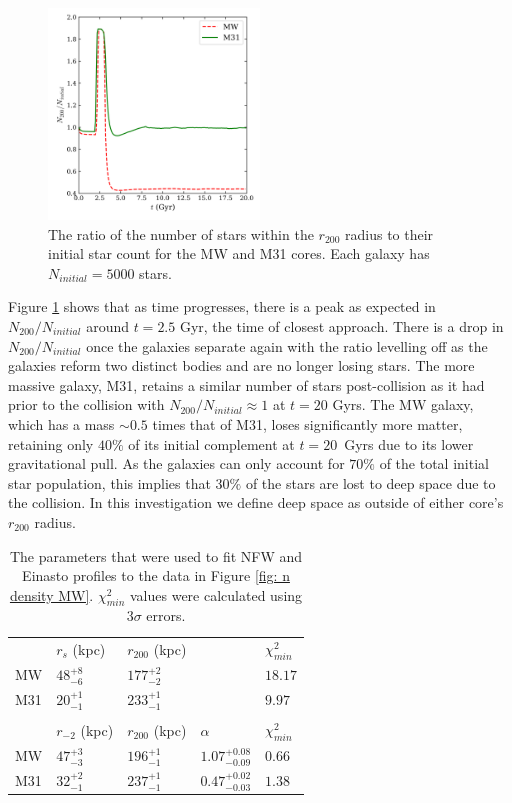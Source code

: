 \documentclass[10pt, twocolumn]{revtex4}    %
\begin{document}
\begin{figure}[h!]
\centering
\includegraphics[width=0.5\textwidth]{20180315_005630_N_IN_200_FIG_20_Gyrs}
\caption{The ratio of the number of stars within the $r_{200}$ radius to their initial star count for the MW and M31 cores. Each galaxy has $N_{initial}=5000$ stars.}
\label{fig: n with r200}
\end{figure}
Figure \ref{fig: n with r200} shows that as time progresses, there is a peak as expected in $N_{200}/N_{initial}$ around $t=2.5$ Gyr, the time of closest approach. There is a drop in $N_{200}/N_{initial}$ once the galaxies separate again with the ratio levelling off as the galaxies reform two distinct bodies and are no longer losing stars. The more massive galaxy, M31, retains a similar number of stars post-collision as it had prior to the collision with $N_{200}/N_{initial} \approx 1$ at $t=20$ Gyrs. The MW galaxy, which has a mass ${\sim}0.5$ times that of M31, loses significantly more matter, retaining only $40\%$ of its initial complement at $t=20$~Gyrs due to its lower gravitational pull. As the galaxies can only account for $70\%$ of the total initial star population, this implies that $30\%$ of the stars are lost to deep space due to the collision. In this investigation we define deep space as outside of either core's $r_{200}$ radius.

\begin{table}[h!]
\centering
\begin{tabularx}{0.5\textwidth}{ Y Y Y Y Y }
\hhline{=====}
 \\ \hline
& $r_s$ (kpc) & $r_{200}$ (kpc) & & $\chi^2_{min}$ \\[3pt] 
MW & $48^{+8}_{-6}$ & $177^{+2}_{-2}$& & $18.17$ \\[3pt] 
M31 & $20^{+1}_{-1}$ & $233^{+1}_{-1}$& & $9.97$\\[3pt] \hhline{=====}
 \\ \hline
&  $r_{-2}$ (kpc) & $r_{200}$ (kpc) & $\alpha$ & $\chi^2_{min}$ \\[3pt] 
MW & $47^{+3}_{-3}$ & $196^{+1}_{-1}$ & $1.07^{+0.08}_{-0.09}$ & $0.66$ \\[3pt]
M31 & $32^{+2}_{-1}$ & $237^{+1}_{-1}$ & $0.47^{+0.02}_{-0.03}$ & $1.38$ \\[3pt] \hline
\end{tabularx}
\caption{The parameters that were used to fit NFW and Einasto profiles to the data in Figure \ref{fig: n density MW}. $\chi^2_{min}$ values were calculated using 3$\sigma$ errors.}
\label{table: NFW/Ein params}
\end{table}
\end{document}
